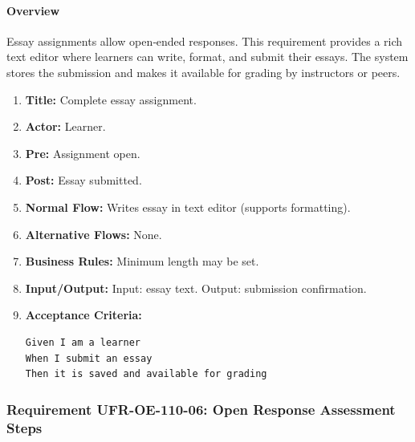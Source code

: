 \paragraph{Overview}
Essay assignments allow open‑ended responses. This requirement provides a rich text editor where learners can write, format, and submit their essays. The system stores the submission and makes it available for grading by instructors or peers.
\begin{enumerate}[label=\textbf{\arabic*.}]
\item \textbf{Title:} Complete essay assignment.
\item \textbf{Actor:} Learner.
\item \textbf{Pre:} Assignment open.
\item \textbf{Post:} Essay submitted.
\item \textbf{Normal Flow:} Writes essay in text editor (supports formatting).
\item \textbf{Alternative Flows:} None.
\item \textbf{Business Rules:} Minimum length may be set.
\item \textbf{Input/Output:} Input: essay text. Output: submission confirmation.
\item \textbf{Acceptance Criteria:}
    \begin{verbatim}
Given I am a learner
When I submit an essay
Then it is saved and available for grading
    \end{verbatim}
\end{enumerate}

\subsubsection{Requirement UFR-OE-110-06: Open Response Assessment Steps}
